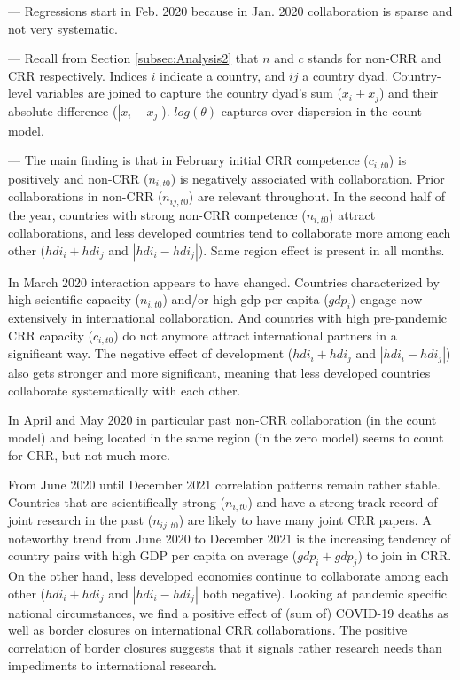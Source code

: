 {\begin{landscape}
\begin{table}[ht]
\begin{threeparttable}
\begin{tablenotes}
    \item --- Regressions start in Feb. 2020 because in Jan. 2020 collaboration is sparse and not very systematic. 
  \item --- Recall from Section \ref{subsec:Analysis2} that $n$ and $c$ stands for non-CRR and CRR respectively. Indices $i$ indicate a country, and $ij$ a country dyad. Country-level variables are joined to capture the country dyad's sum ($x_i + x_j$) and their absolute difference ($|x_i - x_j|$).  $log(\theta)$ captures over-dispersion in the count model.
  \item --- The main finding is that in February initial CRR competence ($c_{i,t0}$) is positively and non-CRR ($n_{i,t0}$) is negatively associated with collaboration. Prior collaborations in non-CRR ($n_{ij,t0}$) are relevant throughout. In the second half of the year, countries with strong non-CRR competence ($n_{i,t0}$) attract collaborations, and less developed countries tend to collaborate more among each other ($hdi_i + hdi_j$ and $|hdi_i - hdi_j|$). Same region effect is present in all months.
    \end{tablenotes}
\end{threeparttable}
\end{table}
\hfill
\end{landscape}}




In March 2020 interaction appears to have changed. Countries characterized by high scientific capacity ($n_{i,t0}$) and/or high gdp per capita ($gdp_i$) engage now extensively in international collaboration. And countries with high pre-pandemic CRR capacity ($c_{i,t0}$) do not anymore attract international partners in a significant way. The negative effect of development ($hdi_i + hdi_j$ and $|hdi_i - hdi_j|$) also gets stronger and more significant, meaning that less developed countries collaborate systematically with each other. 

In April and May 2020 in particular past non-CRR collaboration (in the count model) and being located in the same region (in the zero model) seems to count for CRR, but not much more. 

From June 2020 until December 2021 correlation patterns remain rather stable. Countries that are scientifically strong ($n_{i,t0}$) and have a strong track record of joint research in the past ($n_{ij,t0}$) are likely to have many joint CRR papers. A noteworthy trend from June 2020 to December 2021 is the increasing tendency of country pairs with high GDP per capita on average ($gdp_i + gdp_j$) to join in CRR. On the other hand, less developed economies continue to collaborate among each other ($hdi_i + hdi_j$ and $|hdi_i - hdi_j|$ both negative). Looking at pandemic specific national circumstances, we find a positive effect of (sum of) COVID-19 deaths as well as border closures on international CRR collaborations. The positive correlation of border closures suggests that it signals rather research needs than impediments to international research.  

